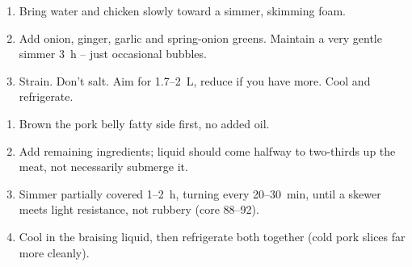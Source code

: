 


\begin{ingredients}
\end{ingredients}

\begin{recipe}
  \begin{enumerate}

  \item Bring water and chicken slowly toward a simmer, skimming
    foam.

  \item Add onion, ginger, garlic and spring-onion greens. Maintain a
    very gentle simmer 3~h -- just occasional bubbles.

  \item Strain. Don't salt. Aim for 1.7--2~L, reduce if you have
    more. Cool and refrigerate.

  \end{enumerate}
\end{recipe}



\begin{ingredients}
\end{ingredients}

\begin{recipe}
  \begin{enumerate}

  \item Brown the pork belly fatty side first, no added oil.

  \item Add remaining ingredients; liquid should come halfway to
    two-thirds up the meat, not necessarily submerge it.

  \item Simmer partially covered 1\textonehalf--2~h, turning every
    20--30~min, until a skewer meets light resistance, not rubbery
    (core 88--92\degreeC).

  \item Cool in the braising liquid, then refrigerate both together
    (cold pork slices far more cleanly).

  \end{enumerate}
\end{recipe}


